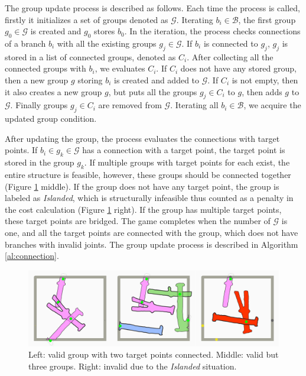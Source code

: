 The group update process is described as follows.
Each time the process is called, firstly it initializes a set of groups denoted as $\mathcal{G}$.
Iterating $b_i \in \mathcal{B}$, the first group $g_0 \in \mathcal{G}$ is created and $g_0$ stores $b_0$.
In the iteration, the process checks connections of a branch $b_i$ with all the existing groups $ g_j \in \mathcal{G}$.
If $b_i$ is connected to $g_j$, $g_j$ is stored in a list of connected groups, denoted as $C_i$.
After collecting all the connected groups with $b_i$, we evaluates $C_i$.
If $C_i$ does not have any stored group, then a new group $g$ storing $b_i$ is created and added to $\mathcal{G}$.
If $C_i$ is not empty, then it also creates a new group $g$, but puts all the groups $g_j \in C_i$ to $g$, then adds $g$ to $\mathcal{G}$.
Finally groups $g_j \in C_i$ are removed from $\mathcal{G}$.
Iterating all $b_i \in \mathcal{B}$, we acquire the updated group condition.

After updating the group, the process evaluates the connections with target points.
If $b_i \in g_k \in \mathcal{G}$ has a connection with a target point, the target point is stored in the group $g_k$.
If multiple groups with target points for each exist, the entire structure is feasible, however, these groups should be connected together (Figure \ref{fig:group} middle).
If the group does not have any target point, the group is labeled as \textit{Islanded}, which is structurally infeasible thus counted as a penalty in the cost calculation (Figure \ref{fig:group} right).
If the group has multiple target points, these target points are bridged.
The game completes when the number of $\mathcal{G}$ is one, and all the target points are connected with the group, which does not have branches with invalid joints.
The group update process is described in Algorithm \ref{al:connection}.

\begin{figure}[ht]
  \begin{center}
    \includegraphics[width = 0.4\paperwidth]{images/interface/groups.jpg}
    \caption{Left: valid group with two target points connected. Middle: valid but three groups. Right: invalid due to the \textit{Islanded} situation. }
    \label{fig:group}
  \end{center}
\end{figure}

